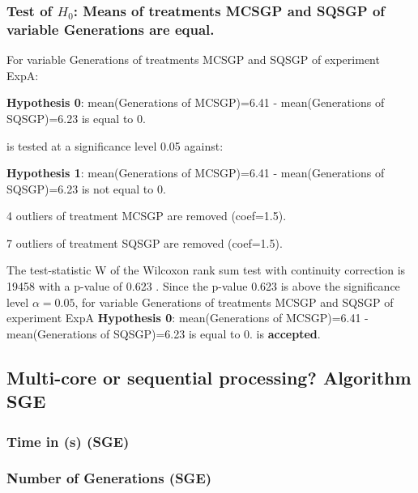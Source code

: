 \documentclass[18pt,c]{beamer}
\makeatletter
\let\beamer@writeslidentry@miniframeson=\beamer@writeslidentry
\newcommand*{\miniframeson}{\let\beamer@writeslidentry=\beamer@writeslidentry@miniframeson}
\makeatother
\begin{document}
\begin{frame}[t]
 \frametitle{Test of $H_{0}$: Means of treatments MCSGP and SQSGP of variable Generations are equal. }
 \scriptsize
 For variable Generations of treatments MCSGP and SQSGP of experiment ExpA:

\vspace{1mm}
{\bf Hypothesis 0}: mean(Generations of MCSGP)=6.41 - mean(Generations of SQSGP)=6.23 is equal to 0.


 \begin{center} is tested at a significance level 0.05 against: \end{center}

{\bf Hypothesis 1}: mean(Generations of MCSGP)=6.41 - mean(Generations of SQSGP)=6.23 is not equal to 0.
\vspace{1mm}
\vspace{1mm}

 4 outliers of treatment MCSGP are removed (coef=1.5).

 7 outliers of treatment SQSGP are removed (coef=1.5).
\vspace{1mm}
 
 The test-statistic W of the Wilcoxon rank sum test with continuity correction is 19458 with a p-value of 0.623 .
 Since the p-value 0.623 is above the significance level $\alpha= 0.05 $,
 for variable Generations of treatments MCSGP and SQSGP of experiment ExpA 
 {\bf Hypothesis 0}: mean(Generations of MCSGP)=6.41 - mean(Generations of SQSGP)=6.23 is equal to 0.
is {\bf accepted}.

 \end{frame}
\miniframeson
\subsection{Multi-core or sequential processing? Algorithm SGE}
 \begin{frame}
 \fontsize{8pt}{9pt}\selectfont
 \frametitle{ Time in (s) (SGE) }

 \label{ExpAStatsTable005.tex}  
 \end{frame}

 \begin{frame}
 \fontsize{8pt}{9pt}\selectfont
 \frametitle{ Number of Generations (SGE) }

 \label{ExpAStatsTable006.tex}  
 \end{frame}
\end{document}
